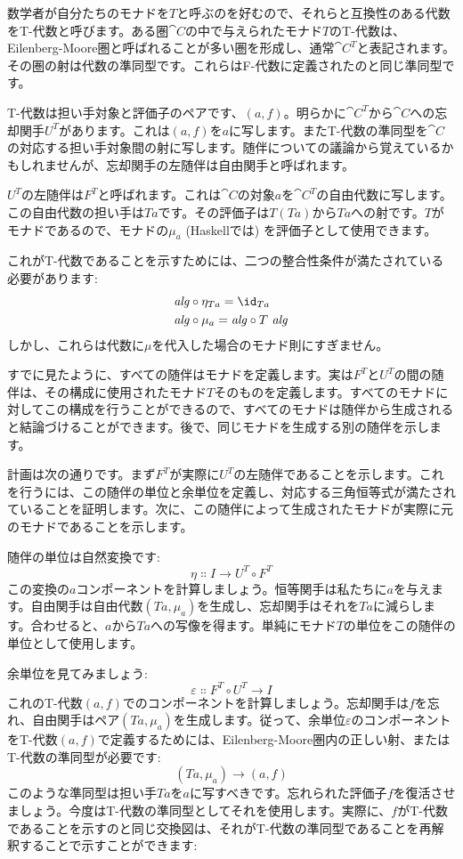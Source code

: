 数学者が自分たちのモナドを$T$と呼ぶのを好むので、それらと互換性のある代数をT-代数と呼びます。ある圏$\cat{C}$の中で与えられたモナド$T$のT-代数は、Eilenberg-Moore圏と呼ばれることが多い圏を形成し、通常$\cat{C}^T$と表記されます。その圏の射は代数の準同型です。これらはF-代数に定義されたのと同じ準同型です。

T-代数は担い手対象と評価子のペアです、$(a, f)$。明らかに$\cat{C}^T$から$\cat{C}$への忘却関手$U^T$があります。これは$(a, f)$を$a$に写します。またT-代数の準同型を$\cat{C}$の対応する担い手対象間の射に写します。随伴についての議論から覚えているかもしれませんが、忘却関手の左随伴は自由関手と呼ばれます。

$U^T$の左随伴は$F^T$と呼ばれます。これは$\cat{C}$の対象$a$を$\cat{C}^T$の自由代数に写します。この自由代数の担い手は$T a$です。その評価子は$T (T a)$から$T a$への射です。$T$がモナドであるので、モナドの$\mu_a$ (Haskellでは) を評価子として使用できます。

これがT-代数であることを示すためには、二つの整合性条件が満たされている必要があります: 
\begin{align*}
  \mathit{alg} & \circ \eta_{Ta} = \id_{Ta}     \\
  \mathit{alg} & \circ \mu_a = \mathit{alg} \circ T\ \mathit{alg}
\end{align*}
しかし、これらは代数に$\mu$を代入した場合のモナド則にすぎません。

すでに見たように、すべての随伴はモナドを定義します。実は$F^T$と$U^T$の間の随伴は、その構成に使用されたモナド$T$そのものを定義します。すべてのモナドに対してこの構成を行うことができるので、すべてのモナドは随伴から生成されると結論づけることができます。後で、同じモナドを生成する別の随伴を示します。

計画は次の通りです。まず$F^T$が実際に$U^T$の左随伴であることを示します。これを行うには、この随伴の単位と余単位を定義し、対応する三角恒等式が満たされていることを証明します。次に、この随伴によって生成されたモナドが実際に元のモナドであることを示します。

随伴の単位は自然変換です: 
\[\eta \Colon I \to U^T \circ F^T\]
この変換の$a$コンポーネントを計算しましょう。恒等関手は私たちに$a$を与えます。自由関手は自由代数$(T a, \mu_a)$を生成し、忘却関手はそれを$T a$に減らします。合わせると、$a$から$T a$への写像を得ます。単純にモナド$T$の単位をこの随伴の単位として使用します。

余単位を見てみましょう: 
\[\varepsilon \Colon F^T \circ U^T \to I\]
これのT-代数$(a, f)$でのコンポーネントを計算しましょう。忘却関手は$f$を忘れ、自由関手はペア$(T a, \mu_a)$を生成します。従って、余単位$\varepsilon$のコンポーネントをT-代数$(a, f)$で定義するためには、Eilenberg-Moore圏内の正しい射、またはT-代数の準同型が必要です: 
\[(T a, \mu_a) \to (a, f)\]
このような準同型は担い手$T a$を$a$に写すべきです。忘れられた評価子$f$を復活させましょう。今度はT-代数の準同型としてそれを使用します。実際に、$f$がT-代数であることを示すのと同じ交換図は、それがT-代数の準同型であることを再解釈することで示すことができます: 

